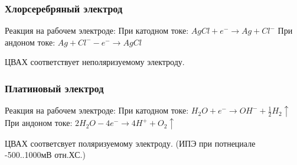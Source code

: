 \documentclass[a4paper, 12pt]{article}
\begin{document}
\subsubsection{Хлорсеребряный электрод}

Реакция на рабочем электроде: \newline
При катодном токе: $AgCl + e^- \rightarrow Ag + Cl^-$ \newline
При андоном токе: $Ag + Cl^- - e^- \rightarrow AgCl$ 

ЦВАХ соответствует неполяризуемому электроду.

\subsubsection{Платиновый электрод}

Реакция на рабочем электроде: \newline
При катодном токе: $H_{2}O+e^- \rightarrow OH^- +\frac{1}{2} H_2\uparrow$\newline
При андоном токе: $2H_{2}O - 4e^- \rightarrow 4H^+ + O_2 \uparrow$

ЦВАХ соответсвует поляризуемому электроду. (ИПЭ при потнециале -500..1000мВ отн.ХС.)
\end{document}
